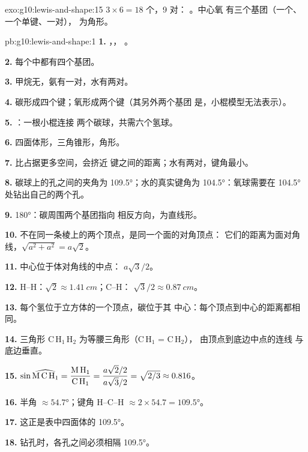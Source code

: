 \begin{solution}{exo:g10:lewis-and-shape:15}
$3 \times 6 = 18$ 个，9 对：
。中心氧
有三个基团（一个、一个单键、一对），
为角形。
\end{solution}

\begin{solution}{pb:g10:lewis-and-shape:1}
\textbf{1.} ，，
。

\textbf{2.} 每个中都有四个基团。

\textbf{3.} 甲烷无，氨有一对，水有两对。

\textbf{4.} 碳形成四个键；氧形成两个键（其另外两个基团
是，小棍模型无法表示）。

\textbf{5.} ：一根小棍连接
两个碳球，共需六个氢球。

\textbf{6.} 四面体形，三角锥形，角形。

\textbf{7.} 比占据更多空间，会挤近
键之间的距离；水有两对，键角最小。

\textbf{8.} 碳球上的孔之间的夹角为 \ang{109.5}；水的真实键角为
\ang{104.5}：氧球需要在 \ang{104.5} 处钻出自己的两个孔。

\textbf{9.} \ang{180}：碳周围两个基团指向
相反方向，为直线形。

\textbf{10.} 不在同一条棱上的两个顶点，是同一个面的对角顶点：
它们的距离为面对角线，$\sqrt{a^2 + a^2} = a\sqrt{2}$。

\textbf{11.} 中心位于体对角线的中点：
$a\sqrt{3}/2$。

\textbf{12.} H--H：$\sqrt{2} \approx \qty{1.41}{cm}$；C--H：
$\sqrt{3}/2 \approx \qty{0.87}{cm}$。

\textbf{13.} 每个氢位于立方体的一个顶点，碳位于其
中心：每个顶点到中心的距离都相同。

\textbf{14.} 三角形 C\,H$_1$\,H$_2$ 为等腰三角形（C\,H$_1$ = C\,H$_2$），
由顶点到底边中点的连线
与底边垂直。

\textbf{15.} $\sin \widehat{\text{M\,C\,H}_1} = \dfrac{\text{M\,H}_1}{\text{C\,H}_1}
= \dfrac{a\sqrt{2}/2}{a\sqrt{3}/2} = \sqrt{2/3} \approx 0.816$。

\textbf{16.} 半角 $\approx \ang{54.7}$；键角 H--C--H $\approx
2 \times 54.7 = \ang{109.5}$。

\textbf{17.} 这正是表中四面体的 \ang{109.5}。

\textbf{18.} 钻孔时，各孔之间必须相隔 \ang{109.5}。
\end{solution}
